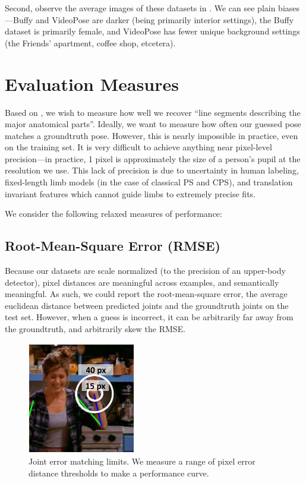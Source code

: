Second, observe the average images of these datasets in 
.  We can see plain biases---Buffy and 
VideoPose are darker (being primarily interior settings), the Buffy dataset is 
primarily female, and VideoPose has fewer unique background settings (the 
Friends' apartment, coffee shop, etcetera).


\section{Evaluation Measures}

Based on , we wish to measure how well we recover ``line segments 
describing the major anatomical parts''.  Ideally, we want to measure how often 
our guessed pose matches a groundtruth pose.  However, this is nearly 
impossible in practice, even on the training set. It is very difficult to 
achieve anything near pixel-level precision---in practice, 1 pixel is 
approximately the size of a person's pupil at the resolution we use.  This lack 
of precision is due to uncertainty in human labeling, fixed-length limb models 
(in the case of classical PS and CPS), and translation invariant features which 
cannot guide limbs to extremely precise fits.

We consider the following relaxed measures of performance:

\subsection{Root-Mean-Square Error (RMSE)}  Because our datasets are scale 
normalized (to the precision of an upper-body detector), pixel distances are 
meaningful across examples, and semantically meaningful.  As such, we could 
report the root-mean-square error, the average euclidean distance between 
predicted joints and the groundtruth joints on the test set.  However, when a 
guess is incorrect, it can be arbitrarily far away from the groundtruth, and 
arbitrarily skew the RMSE.  


\begin{figure}[t]
\begin{center}
\includegraphics[width=0.42\textwidth]{figs/pixel-err-demo}
\caption[Joint error matching limits.]{Joint error matching limits.  We measure 
a range of pixel error distance thresholds to make a performance curve.}
\label{fig:pixel-err-demo}
\end{center}
\end{figure}


